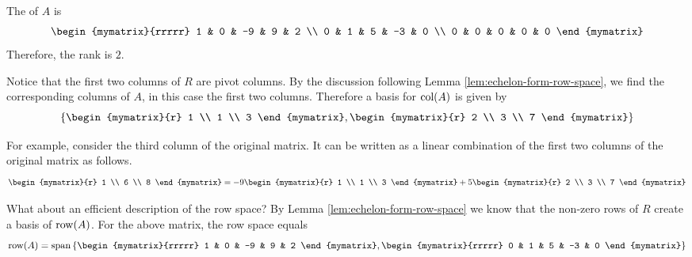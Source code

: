 \begin{solution}
The {\rref} of $A$ is 
\begin{equation*}
\begin{mymatrix}{rrrrr}
1 & 0 & -9 & 9 & 2 \\ 
0 & 1 & 5 & -3 & 0 \\ 
0 & 0 & 0 & 0 & 0
\end{mymatrix} 
\end{equation*}
Therefore, the rank is $2$.

Notice that the first two columns of $R$ are pivot columns. By the discussion following Lemma \ref{lem:echelon-form-row-space}, we find the corresponding columns of $A$, in this case the first two columns. Therefore a basis for $\mbox{\rm col}(A)$ is given by
\[
\set{\begin{mymatrix}{r}
1 \\ 
1 \\ 
3
\end{mymatrix} , \begin{mymatrix}{r}
2 \\ 
3 \\ 
7
\end{mymatrix}
}
\] 

 For
example, consider the third column of the original matrix. It can be written as a linear combination of the first two columns of the original matrix as follows.
\begin{equation*}
\begin{mymatrix}{r}
1 \\ 
6 \\ 
8
\end{mymatrix} =-9\begin{mymatrix}{r}
1 \\ 
1 \\ 
3
\end{mymatrix} +5\begin{mymatrix}{r}
2 \\ 
3 \\ 
7
\end{mymatrix} 
\end{equation*}

What about an efficient description of the row space? By Lemma \ref{lem:echelon-form-row-space} we know that the non-zero rows of $R$ create a basis of $\mbox{\rm row}(A)$.  For the above matrix, the row space equals 
\[
\func{row}(A) = 
\func{span} \set{
\begin{mymatrix}{rrrrr}
1 & 0 & -9 & 9 & 2
\end{mymatrix}, \begin{mymatrix}{rrrrr}
0 & 1 & 5 & -3 & 0
\end{mymatrix}
}
\]
\end{solution}


